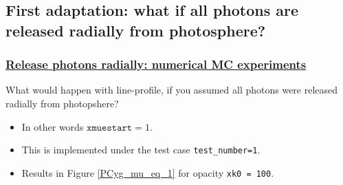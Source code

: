 \documentclass[../main/main.tex]{subfiles}
\begin{document}
\newpage
\subsection{First adaptation: what if all photons are released radially from photosphere?}
\label{PCYG FIRST adaptation}

\subsubsection{\underline{Release photons radially: numerical MC experiments}}
What would happen with line-profile, if you assumed all photons
were released radially from photopshere?
\begin{itemize}
\item In other words $\texttt{xmuestart} = 1$. 
\item This is implemented under the test case \texttt{test\_number=1}.
\item Results in Figure \ref{PCyg_mu_eq_1} for opacity \texttt{xk0 = 100}.
\end{itemize}
\end{document}
